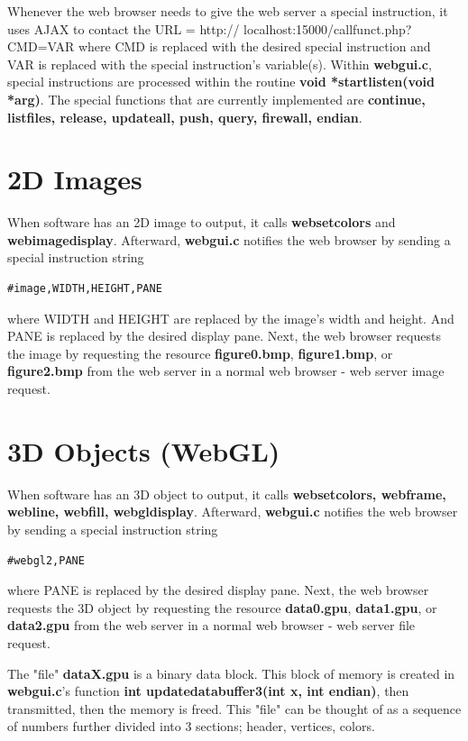 Whenever the web browser needs to give the web server a special instruction, it uses AJAX to contact the URL = http://
localhost:15000/callfunct.php?CMD=VAR where CMD is replaced with the desired special instruction and VAR is replaced with
the special instruction's variable(s). Within \textbf{webgui.c}, special instructions are processed within the routine 
\textbf{void *startlisten(void *arg)}. The special functions that are currently implemented are \textbf{continue, listfiles, release,
updateall, push, query, firewall, endian}.   

\section{2D Images}
\label{sec:7-6}

When software has an 2D image to output, it calls \textbf{websetcolors} and \textbf{webimagedisplay}. Afterward, \textbf{webgui.c}
notifies the web browser by sending a special instruction string
\begin{verbatim}
#image,WIDTH,HEIGHT,PANE
\end{verbatim}
where WIDTH and HEIGHT are replaced by the image's width and height. And PANE is replaced by the desired display pane.
Next, the web browser requests the image by requesting the resource \textbf{figure0.bmp}, \textbf{figure1.bmp}, or
\textbf{figure2.bmp} from the web server in a normal web browser - web server image request.

\section{3D Objects (WebGL)}
\label{sec:7-5}

When software has an 3D object to output, it calls \textbf{websetcolors, webframe, webline, webfill, webgldisplay}. Afterward, \textbf{webgui.c}
notifies the web browser by sending a special instruction string
\begin{verbatim}
#webgl2,PANE
\end{verbatim}
where PANE is replaced by the desired display pane.
Next, the web browser requests the 3D object by requesting the resource \textbf{data0.gpu}, \textbf{data1.gpu}, or
\textbf{data2.gpu} from the web server in a normal web browser - web server file request.

The "file" \textbf{dataX.gpu} is a binary data block. This block of memory is created in \textbf{webgui.c}'s function 
\textbf{int updatedatabuffer3(int x, int endian)}, then transmitted, then the memory is freed.
This "file" can be thought of as a sequence of numbers further divided into 3 sections; header, vertices, colors.

